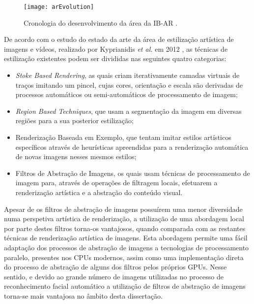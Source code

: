 \begin{figure}[ht]
  \begin{center}
    \leavevmode
    \texttt{[image: arEvolution]}
    \caption{Cronologia do desenvolvimento da área da IB-AR \cite{Kyprianidis2012}.}
    \label{fig:arEvolution}
  \end{center}
\end{figure}

De acordo com o estudo do estado da arte da área de estilização artística de imagens e vídeos, realizado por Kyprianidis \textit{et al.} em 2012 \cite{Kyprianidis2012}, as técnicas de estilização existentes podem ser divididas nas seguintes quatro categorias:
\begin{itemize}
\item \textit{Stoke Based Rendering}, as quais criam iterativamente camadas virtuais de traços imitando um pincel, cujas cores, orientação e escala são derivadas de processos automáticos ou semi-automáticos de processamento de imagem; 
\item \textit{Region Based Techniques}, que usam a segmentação da imagem em diversas regiões para a sua posterior estilização;
\item Renderização Baseada em Exemplo, que tentam imitar estilos artísticos específicos através de heurísticas apreendidas para a renderização automática de novas imagens nesses mesmos estilos;
\item Filtros de Abstração de Imagens, os quais usam técnicas de processamento de imagem para, através de operações de filtragem locais, efetuarem a renderização artística e a abstração do conteúdo visual.
\end{itemize}

Apesar de os filtros de abstração de imagens possuírem uma menor diversidade numa perspetiva artística de renderização, a utilização de uma abordagem local por parte destes filtros torna-os vantajosos, quando comparada com as restantes técnicas de renderização artística de imagens. Esta abordagem permite uma fácil adaptação dos processos de abstração de imagens a tecnologias de processamento paralelo, presentes nos CPUs modernos, assim como uma implementação direta do processo de abstração de alguns dos filtros pelos próprios GPUs. Nesse sentido, e devido ao grande número de imagens utilizadas no processo de reconhecimento facial automático a utilização de filtros de abstração de imagens torna-se mais vantajosa no âmbito desta dissertação.

